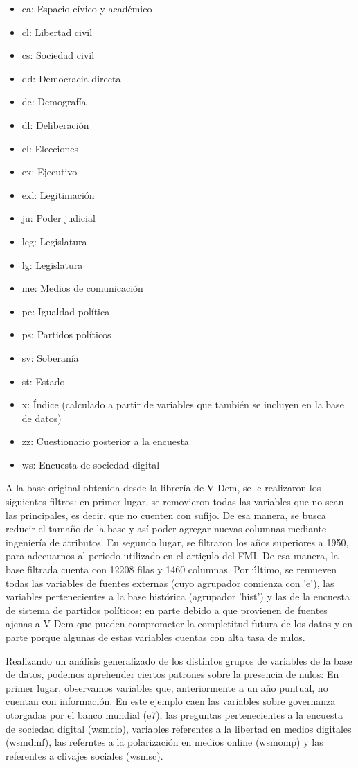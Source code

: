 \documentclass{article}
\begin{document}
\begin{itemize}
  \item ca: Espacio cívico y académico
  \item cl: Libertad civil
  \item cs: Sociedad civil
  \item dd: Democracia directa
  \item de: Demografía
  \item dl: Deliberación
  \item el: Elecciones
  \item ex: Ejecutivo
  \item exl: Legitimación
  \item ju: Poder judicial
  \item leg: Legislatura
  \item lg: Legislatura
  \item me: Medios de comunicación
  \item pe: Igualdad política
  \item ps: Partidos políticos
  \item sv: Soberanía
  \item st: Estado
  \item x: Índice (calculado a partir de variables que también se 
  incluyen en la base de datos)
  \item zz: Cuestionario posterior a la encuesta
  \item ws: Encuesta de sociedad digital
\end{itemize}

A la base original obtenida desde la librería de V-Dem, se le realizaron los
siguientes filtros: en primer lugar, se removieron todas las variables que
no sean las principales, es decir, que no cuenten con sufijo. De esa manera,
se busca reducir el tamaño de la base y así poder agregar nuevas columnas
mediante ingeniería de atributos. En segundo lugar, se filtraron los años 
superiores a 1950, para adecuarnos al periodo utilizado en el artiçulo del FMI.
De esa manera, la base filtrada cuenta con 12208 filas y 1460 columnas. Por último,
se remueven todas las variables de fuentes externas (cuyo agrupador comienza con
'e'), las variables pertenecientes a la base histórica (agrupador 'hist') y las
de la encuesta de sistema de partidos políticos; en parte debido a que provienen
de fuentes ajenas a V-Dem que pueden comprometer la completitud futura de los datos
y en parte porque algunas de estas variables cuentas con alta tasa de nulos.

Realizando un análisis generalizado de los distintos grupos de variables de la base de
datos, podemos aprehender ciertos patrones sobre la presencia de nulos: 
En primer lugar, observamos variables que,
anteriormente a un año puntual, no cuentan con información. En este ejemplo caen
las variables sobre governanza otorgadas por el banco mundial (e7), las preguntas
pertenecientes a la encuesta de sociedad digital (wsmcio), variables referentes a
la libertad en medios digitales (wsmdmf), las referntes a la polarización en medios
online (wsmomp) y las referentes a clivajes sociales (wsmsc).
\end{document}
